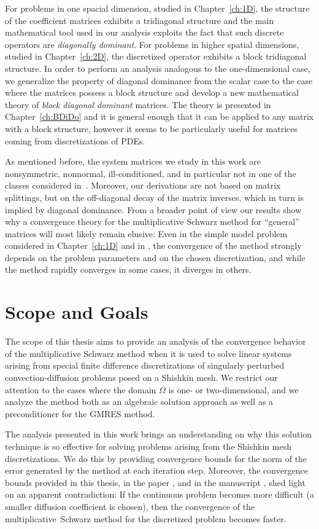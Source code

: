 For problems in one spacial dimension, studied in Chapter~\ref{ch:1D}, the
structure of the coefficient matrices exhibits a tridiagonal structure and the
main mathematical tool used in our analysis exploits the fact that such
discrete operators are \emph{diagonally dominant}. For problems in higher spatial dimensions, studied
in Chapter~\ref{ch:2D}, the discretized operator exhibits a block tridiagonal
structure. In order to perform an analysis analogous to the one-dimensional
case, we generalize the property of diagonal dominance from the scalar case to
the case where the matrices possess a block structure and develop a new
mathematical theory of \emph{block diagonal dominant} matrices. The theory is
presented in Chapter~\ref{ch:BDiDo} and it is general enough that it can be
applied to any matrix with a block structure, however it seems to be
particularly useful for matrices coming from discretizations of PDEs.

As mentioned before, the system matrices we study in this work are
nonsymmetric,  nonnormal, ill-conditioned, and in particular not in one of the
classes considered in~\cite{BenFroNabSzy01,BruPedSzy04,FroNabSzy08,FroSzy14}.
Moreover, our derivations are not based on matrix splittings, but on the
off-diagonal decay of the matrix inverses, which in turn is implied by diagonal
dominance. From a broader point of view our results show why a convergence
theory for the multiplicative Schwarz method for ``general'' matrices will most
likely remain elusive: Even in the simple model problem considered
in Chapter~\ref{ch:1D} and in \cite{EchLieSzyTic18}, the convergence of the
method strongly depends on the problem parameters and on the chosen
discretization, and while the method rapidly converges in some cases, it
diverges in others.

\section{Scope and Goals}
The scope of this thesis aims to provide an analysis of the convergence
behavior of the multiplicative Schwarz method when it is used to solve linear
systems arising from special finite difference discretizations of singularly
perturbed convection-diffusion problems posed on a Shishkin mesh. We restrict our attention to the cases where the domain $\Omega$ is one- or
two-dimensional, and we analyze the method both as an algebraic solution
approach as well as a preconditioner for the GMRES method.

The analysis presented in this work brings an understanding on why this
solution technique is so effective for solving problems arising from the
Shishkin mesh discretizations. We do this by providing convergence bounds for
the norm of the error generated by the method at each iteration step.
Moreover, the convergence bounds provided in this thesis, in the paper
\cite{EchLieNab18}, and in the manuscript \cite{EchLieTic19}, shed light on
an apparent contradiction: If the continuous problem becomes more difficult
(a smaller diffusion coefficient is chosen), then the convergence of the
multiplicative~Schwarz method for the discretized problem becomes faster.

